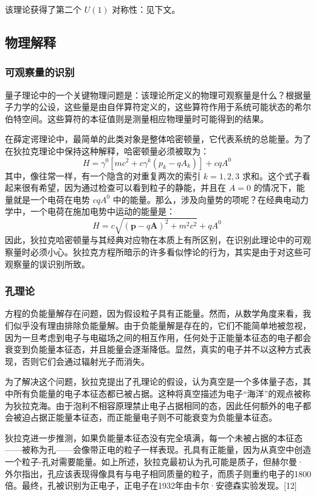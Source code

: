 该理论获得了第二个 \( U(1) \) 对称性：见下文。
\subsection{物理解释}  
\subsubsection{可观察量的识别}
量子理论中的一个关键物理问题是：该理论所定义的物理可观察量是什么？根据量子力学的公设，这些量是由自伴算符定义的，这些算符作用于系统可能状态的希尔伯特空间。这些算符的本征值则是测量相应物理量时可能得到的结果。

在薛定谔理论中，最简单的此类对象是整体哈密顿量，它代表系统的总能量。为了在狄拉克理论中保持这种解释，哈密顿量必须被取为：
\[
H = \gamma^{0}\left[ mc^{2} + c \gamma^{k}\left(p_k - qA_k\right)\right] + cqA^{0}~
\]
其中，像往常一样，有一个隐含的对重复两次的索引 \( k = 1, 2, 3 \) 求和。这个式子看起来很有希望，因为通过检查可以看到粒子的静能，并且在 \( A = 0 \) 的情况下，能量就是一个电荷在电势 \( cqA^{0} \) 中的能量。那么，涉及向量势的项呢？在经典电动力学中，一个电荷在施加电势中运动的能量是：
\[
H = c\sqrt{\left(\mathbf{p} - q\mathbf{A}\right)^{2} + m^{2}c^{2}} + qA^{0}~
\]
因此，狄拉克哈密顿量与其经典对应物在本质上有所区别，在识别此理论中的可观察量时必须小心。狄拉克方程所暗示的许多看似悖论的行为，其实是由于对这些可观察量的误识别所致。
\subsubsection{孔理论}
方程的负能量解存在问题，因为假设粒子具有正能量。然而，从数学角度来看，我们似乎没有理由排除负能量解。由于负能量解是存在的，它们不能简单地被忽视，因为一旦考虑到电子与电磁场之间的相互作用，任何处于正能量本征态的电子都会衰变到负能量本征态，并且能量会逐渐降低。显然，真实的电子并不以这种方式表现，否则它们会通过辐射光子而消失。

为了解决这个问题，狄拉克提出了孔理论的假设，认为真空是一个多体量子态，其中所有负能量的电子本征态都已被占据。这种将真空描述为电子“海洋”的观点被称为狄拉克海。由于泡利不相容原理禁止电子占据相同的态，因此任何额外的电子都会被迫占据正能量本征态，而正能量电子则不可能衰变为负能量本征态。

狄拉克进一步推测，如果负能量本征态没有完全填满，每一个未被占据的本征态——被称为孔——会像带正电的粒子一样表现。孔具有正能量，因为从真空中创造一个粒子-孔对需要能量。如上所述，狄拉克最初认为孔可能是质子，但赫尔曼·外尔指出，孔应该表现得像具有与电子相同质量的粒子，而质子则重约电子的1800倍。最终，孔被识别为正电子，正电子在1932年由卡尔·安德森实验发现。[12]

